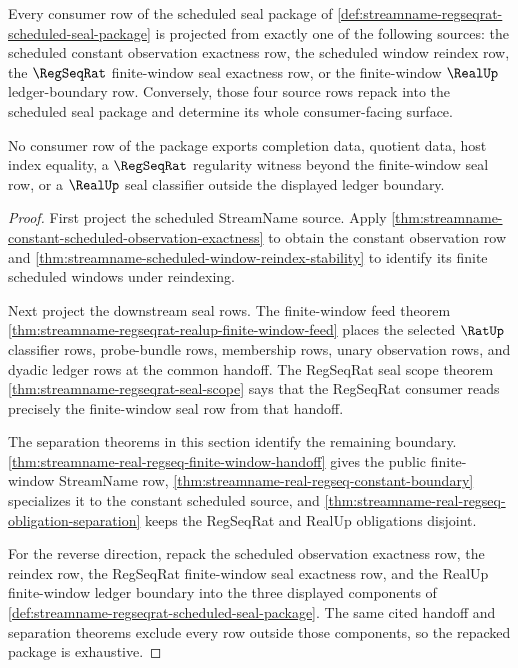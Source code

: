 \begin{theorem}
\label{thm:streamname-regseqrat-scheduled-seal-exhaustion}
Every consumer row of the scheduled seal package of
\autoref{def:streamname-regseqrat-scheduled-seal-package} is projected from
exactly one of the following sources: the scheduled constant observation
exactness row, the scheduled window reindex row, the $\RegSeqRat$
finite-window seal exactness row, or the finite-window $\RealUp$
ledger-boundary row. Conversely, those four source rows repack into the
scheduled seal package and determine its whole consumer-facing surface.

No consumer row of the package exports completion data, quotient data, host
index equality, a $\RegSeqRat$ regularity witness beyond the finite-window seal
row, or a $\RealUp$ seal classifier outside the displayed ledger boundary.
\end{theorem}
\begin{proof}
First project the scheduled StreamName source. Apply
\autoref{thm:streamname-constant-scheduled-observation-exactness} to obtain
the constant observation row and
\autoref{thm:streamname-scheduled-window-reindex-stability} to identify its
finite scheduled windows under reindexing.

Next project the downstream seal rows. The finite-window feed theorem
\autoref{thm:streamname-regseqrat-realup-finite-window-feed} places the
selected $\RatUp$ classifier rows, probe-bundle rows, membership rows, unary
observation rows, and dyadic ledger rows at the common handoff. The RegSeqRat
seal scope theorem \autoref{thm:streamname-regseqrat-seal-scope} says that
the RegSeqRat consumer reads precisely the finite-window seal row from that
handoff.

The separation theorems in this section identify the remaining boundary.
\autoref{thm:streamname-real-regseq-finite-window-handoff} gives the public
finite-window StreamName row, \autoref{thm:streamname-real-regseq-constant-boundary}
specializes it to the constant scheduled source, and
\autoref{thm:streamname-real-regseq-obligation-separation} keeps the
RegSeqRat and RealUp obligations disjoint.

For the reverse direction, repack the scheduled observation exactness row,
the reindex row, the RegSeqRat finite-window seal exactness row, and the
RealUp finite-window ledger boundary into the three displayed components of
\autoref{def:streamname-regseqrat-scheduled-seal-package}. The same cited
handoff and separation theorems exclude every row outside those components, so
the repacked package is exhaustive.
\end{proof}

